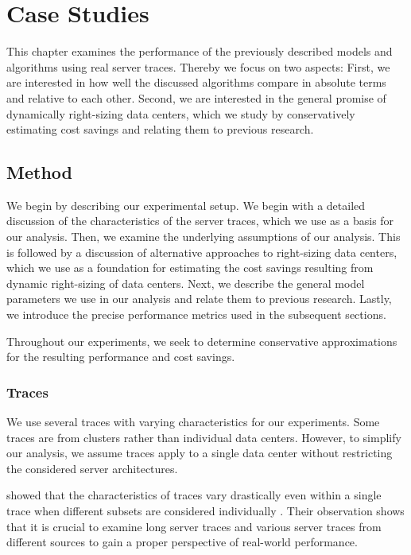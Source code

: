 
\chapter{Case Studies}\label{chapter:case_studies}

This chapter examines the performance of the previously described models and algorithms using real server traces. Thereby we focus on two aspects: First, we are interested in how well the discussed algorithms compare in absolute terms and relative to each other. Second, we are interested in the general promise of dynamically right-sizing data centers, which we study by conservatively estimating cost savings and relating them to previous research.

\section{Method}

We begin by describing our experimental setup. We begin with a detailed discussion of the characteristics of the server traces, which we use as a basis for our analysis. Then, we examine the underlying assumptions of our analysis. This is followed by a discussion of alternative approaches to right-sizing data centers, which we use as a foundation for estimating the cost savings resulting from dynamic right-sizing of data centers. Next, we describe the general model parameters we use in our analysis and relate them to previous research. Lastly, we introduce the precise performance metrics used in the subsequent sections.

Throughout our experiments, we seek to determine conservative approximations for the resulting performance and cost savings.

\subsection{Traces}\label{section:case_studies:method:traces}

We use several traces with varying characteristics for our experiments. Some traces are from clusters rather than individual data centers. However, to simplify our analysis, we assume traces apply to a single data center without restricting the considered server architectures.

\citeauthor*{Amvrosiadis2018} showed that the characteristics of traces vary drastically even within a single trace when different subsets are considered individually \cite{Amvrosiadis2018}. Their observation shows that it is crucial to examine long server traces and various server traces from different sources to gain a proper perspective of real-world performance.

